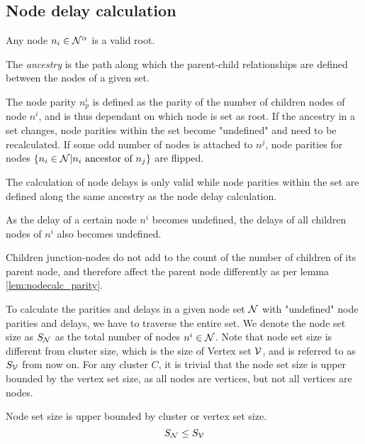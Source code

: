 \subsection{Node delay calculation}


\begin{lemma}
  Any node $n_i \in \mathcal{N}^\alpha$ is a valid root.
\end{lemma}


The \emph{ancestry} is the path along which the parent-child relationships are defined between the nodes of a given set.

\begin{lemma}\label{lem:nodecalc_parity}
  The node parity $n^i_p$ is defined as the parity of the number of children nodes of node $n^i$, and is thus dependant on which node is set as root. If the ancestry in a set changes, node parities within the set become "undefined" and need to be recalculated. If some odd number of nodes is attached to $n^j$, node parities for nodes $\{n_i \in \mathcal{N} | n_i \mbox{ ancestor of } n_j\}$ are flipped.
\end{lemma}


\begin{lemma}\label{lem:nodecalc_ancestrypath}
 The calculation of node delays is only valid while node parities within the set are defined along the same ancestry as the node delay calculation.
\end{lemma}

\begin{lemma}\label{lem:nodecalc_undefineddelay}
  As the delay of a certain node $n^i$ becomes undefined, the delays of all children nodes of $n^i$ also becomes undefined.
\end{lemma}

\begin{lemma}\label{lem:nodecalc_junction}
  Children junction-nodes do not add to the count of the number of children of its parent node, and therefore affect the parent node differently as per lemma \ref{lem:nodecalc_parity}.
\end{lemma}


To calculate the parities and delays in a given node set $\mathcal{N}$ with "undefined" node parities and delays, we have to traverse the entire set. We denote the node set size as $S_{\mathcal{N}}$ as the total number of nodes $n^i \in \mathcal{N}$. Note that node set size is different from cluster size, which is the size of Vertex set $\mathcal{V}$, and is referred to as $S_{\mathcal{V}}$ from now on. For any cluster $C$, it is trivial that the node set size is upper bounded by the vertex set size, as all nodes are vertices, but not all vertices are nodes.
\begin{lemma}\label{lem:upperboundsize}
  Node set size is upper bounded by cluster or vertex set size.
    \begin{equation}\label{eq:upperboundsize}
      S_{\mathcal{N}} \leq S_{\mathcal{V}}
    \end{equation}
\end{lemma}

